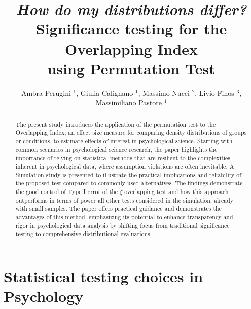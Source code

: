 \documentclass[twocolumn]{article}\usepackage[]{graphicx}\usepackage[]{xcolor}
\begin{document}
\title{\textbf{\textit{How do my distributions differ?} \\ Significance testing for the Overlapping Index \\ using Permutation Test}} %
\author{Ambra Perugini $^1$, Giulia Calignano $^1$, Massimo Nucci $^2$, Livio Finos $^3$, Massimiliano Pastore $^1$}

\maketitle



\begin{abstract}
The present study introduces the application of the permutation test to the Overlapping Index, an effect size measure for comparing density distributions of groups or conditions, to estimate effects of interest in psychological science. Starting with common scenarios in psychological science research, the paper highlights the importance of relying on statistical methods that are resilient to the complexities inherent in psychological data, where assumption violations are often inevitable. A Simulation study is presented to illustrate the practical implications and reliability of the proposed test compared to commonly used alternatives. The findings demonstrate the good control of Type I error of the $\zeta$ overlapping test and how this approach outperforms in terms of power all other tests considered in the simulation, already with small samples. The paper offers practical guidance and demonstrates the advantages of this method, emphasizing its potential to enhance transparency and rigor in psychological data analysis by shifting focus from traditional significance testing to comprehensive distributional evaluations.
\end{abstract}

\section{Statistical testing choices in Psychology}
\end{document}
